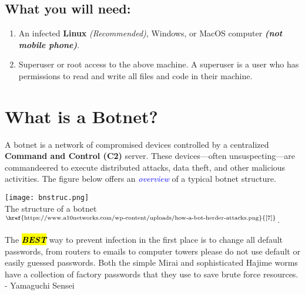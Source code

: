 \documentclass{article}
\begin{document}
\subsection{What you will need:}
\begin{enumerate}
    \item An infected \textbf{Linux} \textit{(Recommended)}, Windows, or MacOS computer \textbf{\textit{(not mobile phone)}}.
    \item Superuser or root access to the above machine. A superuser is a user who has permissions to read and write all files and code in their machine.
\end{enumerate}
\section{What is a Botnet?}
\noindent A botnet is a network of compromised devices controlled by a centralized \textbf{Command and Control (C2)} server. These devices—often unsuspecting—are commandeered to execute distributed attacks, data theft, and other malicious activities. The figure below offers an \textit{\textcolor{blue}{overview}} of a typical botnet structure.
\begin{tcolorbox}[
  colback=backcolour,
  colframe=blue!75!black,
  title={Botnet Structure},
  fonttitle=\bfseries\large\centering,
  arc=4mm,
  boxrule=1pt,
  left=10pt, right=10pt,
  top=10pt, bottom=10pt,
  enhanced
]
\centering
\texttt{[image: bnstruc.png]}\\[2mm]
The structure of a botnet$^{\text{\href{https://www.a10networks.com/wp-content/uploads/how-a-bot-herder-attacks.png}{[7]}}}$.
\end{tcolorbox}
\begin{tcolorbox}[
  colback=backcolour,
  colframe=red!100!black,
  title={\underline{Prevention Tip}},
  fonttitle=\bfseries\large\centering,
  arc=4mm,
  boxrule=1pt,
  left=10pt, right=10pt,
  top=10pt, bottom=10pt,
  enhanced
]
The \textbf{\textit{\hl{BEST}}} way to prevent infection in the first place is to change all default passwords, from routers to emails to computer towers please do not use default or easily guessed passwords. Both the simple Mirai and sophisticated Hajime worms have a collection of factory passwords that they use to save brute force resources.\\ \quad
- Yamaguchi Sensei
\end{tcolorbox}
\end{document}
